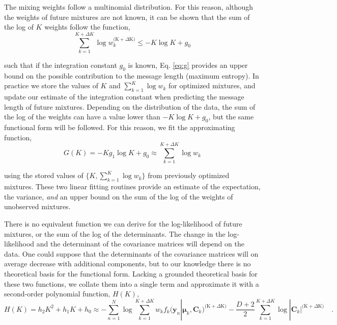 \documentclass{article}
\newcommand{\vect}[1]{\boldsymbol{\mathbf{#1}}}
\def\veccov{\vect{C}}
\def\vecmean{\vect{\mu}}
\def\weight{w}
\def\datum{y}
\def\data{\vect{\datum}}
\def\future{^{\mathrm{(K} + \Delta\mathrm{K)}}}
\begin{document}
The mixing weights follow a multinomial distribution.  For this reason,
although the weights of future mixtures are not known, it can be shown that
the sum of the log of $K$ weights follow the function,
\begin{equation}
  \sum_{k=1}^{K+\Delta{K}}\log\weight_k\future \leq -K\log{K} + g_0
  \label{eq:g}
\end{equation}

\noindent{}such that if the integration constant $g_0$ is known, Eq. \ref{eq:g}
provides an upper bound on the possible contribution to the message length
(maximum entropy).  In practice we store the values of $K$ and 
$\sum_{k=1}^{K}\log\weight_k$ for optimized mixtures, and update our estimate
of the integration constant when predicting the message length of future
mixtures.  Depending on the distribution of the data, the sum of the log of
the weights can have a value lower than $-K\log{K} + g_0$, but the same
functional form will be followed.  For this reason, we fit the approximating
function,
\begin{equation}
G(K) = -Kg_1\log{K} + g_0 \approx \sum_{k=1}^{K+\Delta{K}}\log\weight_k 
\end{equation}

\noindent{}using the stored values of $\{K,\sum_{k=1}^{K}\log\weight_k\}$ from
previously optimized mixtures.  These two linear fitting routines provide an
estimate of the expectation, the variance, \emph{and} an upper bound on the
sum of the log of the weights of unobserved mixtures.


There is no equivalent function we can derive for the log-likelihood of future
mixtures, or the sum of the log of the determinants.  
The change in the log-likelihood and the determinant of the covariance
matrices will depend on the data.
One could suppose that the determinants of the covariance matrices will on
average decrease with additional components, but to our knowledge there is 
no theoretical basis for the functional form.
Lacking a grounded theoretical basis for these two functions, we collate them
into a single term and approximate it with a second-order polynomial function,
$H(K)$,
\begin{equation}
H(K) = h_2K^2 + h_1K + h_0 \approx -\sum_{n=1}^{N}\log\sum_{k=1}^{K+\Delta{K}}\weight_{k}f_{k}(\data_n|\vecmean_k,\veccov_k)\future - \frac{D+2}{2}\sum_{k=1}^{K + \Delta{K}}\log|\veccov_k|\future \quad .
\end{equation}

\end{document}
